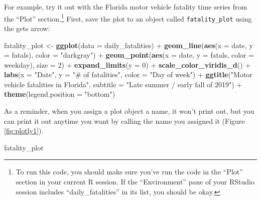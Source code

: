 \documentclass[]{tufte-book}
\newenvironment{Shaded}{}{}
\newcommand{\DataTypeTok}[1]{\textcolor[rgb]{0.56,0.13,0.00}{#1}}
\newcommand{\DecValTok}[1]{\textcolor[rgb]{0.25,0.63,0.44}{#1}}
\newcommand{\KeywordTok}[1]{\textcolor[rgb]{0.00,0.44,0.13}{\textbf{#1}}}
\newcommand{\NormalTok}[1]{#1}
\newcommand{\OperatorTok}[1]{\textcolor[rgb]{0.40,0.40,0.40}{#1}}
\newcommand{\StringTok}[1]{\textcolor[rgb]{0.25,0.44,0.63}{#1}}
\begin{document}
For example, try it out with the Florida motor vehicle fatality time series from the ``Plot''
section.\footnote{To run this code, you should make sure you've run the code in the ``Plot'' section
  in your current R session. If the ``Environment'' pane of your RStudio session includes
  ``daily\_fatalities'' in its list, you should be okay.} First, save the plot to an object
called \texttt{fatality\_plot} using the gets arrow:

\begin{Shaded}
\begin{Highlighting}[]
\NormalTok{fatality_plot <-}\StringTok{ }\KeywordTok{ggplot}\NormalTok{(}\DataTypeTok{data =}\NormalTok{ daily_fatalities) }\OperatorTok{+}\StringTok{ }
\StringTok{    }\KeywordTok{geom_line}\NormalTok{(}\KeywordTok{aes}\NormalTok{(}\DataTypeTok{x =}\NormalTok{ date, }\DataTypeTok{y =}\NormalTok{ fatals), }\DataTypeTok{color =} \StringTok{"darkgray"}\NormalTok{) }\OperatorTok{+}\StringTok{ }
\StringTok{    }\KeywordTok{geom_point}\NormalTok{(}\KeywordTok{aes}\NormalTok{(}\DataTypeTok{x =}\NormalTok{ date, }\DataTypeTok{y =}\NormalTok{ fatals, }\DataTypeTok{color =}\NormalTok{ weekday), }
        \DataTypeTok{size =} \DecValTok{2}\NormalTok{) }\OperatorTok{+}\StringTok{ }\KeywordTok{expand_limits}\NormalTok{(}\DataTypeTok{y =} \DecValTok{0}\NormalTok{) }\OperatorTok{+}\StringTok{ }\KeywordTok{scale_color_viridis_d}\NormalTok{() }\OperatorTok{+}\StringTok{ }
\StringTok{    }\KeywordTok{labs}\NormalTok{(}\DataTypeTok{x =} \StringTok{"Date"}\NormalTok{, }\DataTypeTok{y =} \StringTok{"# of fatalities"}\NormalTok{, }\DataTypeTok{color =} \StringTok{"Day of week"}\NormalTok{) }\OperatorTok{+}\StringTok{ }
\StringTok{    }\KeywordTok{ggtitle}\NormalTok{(}\StringTok{"Motor vehicle fatalities in Florida"}\NormalTok{, }
        \DataTypeTok{subtitle =} \StringTok{"Late summer / early fall of 2019"}\NormalTok{) }\OperatorTok{+}\StringTok{ }
\StringTok{    }\KeywordTok{theme}\NormalTok{(}\DataTypeTok{legend.position =} \StringTok{"bottom"}\NormalTok{)}
\end{Highlighting}
\end{Shaded}

As a reminder, when you assign a plot object a name, it won't print out, but you can print
it out anytime you want by calling the name you assigned it (Figure \ref{fig:plotly1}).

\begin{Shaded}
\begin{Highlighting}[]
\NormalTok{fatality_plot}
\end{Highlighting}
\end{Shaded}
\end{document}

